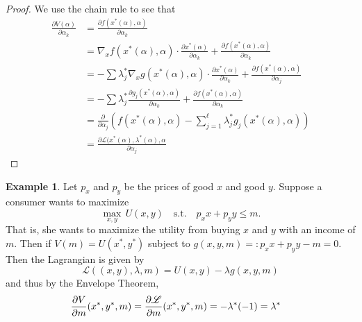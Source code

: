 \documentclass[10pt, oneside]{article}
\theoremstyle{definition}
\newtheorem{exmp}{Example}[section]
\begin{document}
\begin{proof}
    We use the chain rule to see that 
    \begin{align*}
      \frac{\partial V(\alpha)}{\partial \alpha_k} &= \frac{\partial f(x^*(\alpha), \alpha)}{\partial \alpha_k}\\
      &= \nabla_x f(x^*(\alpha), \alpha) \cdot \frac{\partial x^*(\alpha)}{\partial \alpha_k}+\frac{\partial f(x^*(\alpha), \alpha)}{\partial \alpha_k}\\ &= -\sum \lambda_j^* \nabla_x g(x^*(\alpha), \alpha) \cdot \frac{\partial x^*(\alpha)}{\partial \alpha_k}+\frac{\partial f(x^*(\alpha), \alpha)}{\partial \alpha_j}\\
      &= -\sum \lambda_j^*\frac{\partial g_j(x^*(\alpha), \alpha)}{\partial \alpha_k} + \frac{\partial f(x^*(\alpha), \alpha)}{\partial \alpha_k}\\
      &= \frac{\partial}{ \partial \alpha_j} (f(x^*(\alpha), \alpha) - \sum_{j=1}^\ell\lambda_j^* g_j(x^*(\alpha), \alpha))\\
      &= \frac{\partial \mathcal{L}(x^*(\alpha), \lambda^*(\alpha), \alpha}{\partial \alpha_j}
    \end{align*}
\end{proof}

\begin{exmp}
    Let $p_x$ and $p_y$ be the prices of good $x$ and good $y.$ Suppose a consumer wants to maximize 
    \[\max_{x,y}\,U(x,y)\quad \text{s.t.}\quad p_xx  + p_yy \leq m.\] That is, she wants to maximize the utility from buying $x$ and $y$ with an income of $m.$ Then if $V(m) = U(x^*,y^*)$ subject to $g(x,y,m) =: p_xx + p_yy - m = 0.$ Then the Lagrangian is given by 
    \[\mathcal{L}((x, y),\lambda, m)= U(x,y) - \lambda g(x,y,m)\] and thus by the Envelope Theorem, 
    \begin{align}
    \frac{\partial V}{\partial m}(x^*, y^*, m) &= \frac{\partial \cal L}{\partial m}(x^*, y^*, m) = -\lambda^*(-1) = \lambda^*
    \end{align}
     
\end{exmp}

\newpage
\end{document}
